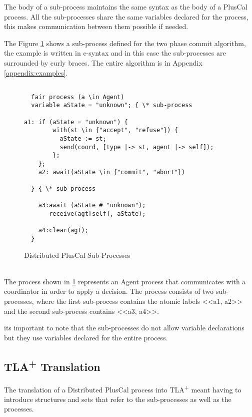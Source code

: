 \documentclass[journal]{IEEEtran}
\newcommand{\tlaplus}{TLA\textsuperscript{+}\xspace}
\begin{document}
The body of a sub-process maintains the same syntax as the body of a PlusCal process. All the sub-processes share the same variables declared for the process, this makes communication between them possible if needed.

The Figure \ref{2pcSub} shows a sub-process defined for the two phase commit algorithm, the example is written in c-syntax and in this case the sub-processes are surrounded by curly braces.
The entire algorithm is in Appendix \ref{appendix:examples}.

\begin{figure}
\begin{lstlisting}[frame = tlrb, firstnumber = 1]
   
  fair process (a \in Agent)
  variable aState = "unknown"; { \* sub-process

a1: if (aState = "unknown") {
        with(st \in {"accept", "refuse"}) {
          aState := st;
          send(coord, [type |-> st, agent |-> self]);
        };
    };
    a2: await(aState \in {"commit", "abort"})
    
  } { \* sub-process
    
    a3:await (aState # "unknown");
       receive(agt[self], aState); 
       
    a4:clear(agt);
  }

\end{lstlisting}
\caption{Distributed PlusCal Sub-Processes}
\label{2pcSub}
\end{figure}

\hfill\\

The process shown in \ref{2pcSub} represents an Agent process that communicates with a coordinator in order to apply a decision. The process consists of two sub-processes, where the first sub-process contains the atomic labels <<a1, a2>> and the second sub-process contains <<a3, a4>>.

its important to note that the sub-processes do not allow variable declarations but they use variables declared for the entire process.

\subsection{\tlaplus Translation}

The translation of a Distributed PlusCal process into \tlaplus meant having to introduce structures and sets that refer to the sub-processes as well as the processes.
\end{document}
